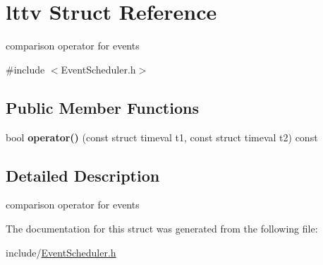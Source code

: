 \hypertarget{structlttv}{}\section{lttv Struct Reference}
\label{structlttv}


comparison operator for events  




{\ttfamily \#include $<$Event\+Scheduler.\+h$>$}

\subsection*{Public Member Functions}
\begin{DoxyCompactItemize}
\item 
\mbox{\label{structlttv_a2f1845392453da6f88f8c0038557290d}} 
bool {\bfseries operator()} (const struct timeval t1, const struct timeval t2) const
\end{DoxyCompactItemize}


\subsection{Detailed Description}
comparison operator for events 

The documentation for this struct was generated from the following file\+:\begin{DoxyCompactItemize}
\item 
include/\hyperlink{EventScheduler_8h}{Event\+Scheduler.\+h}\end{DoxyCompactItemize}
